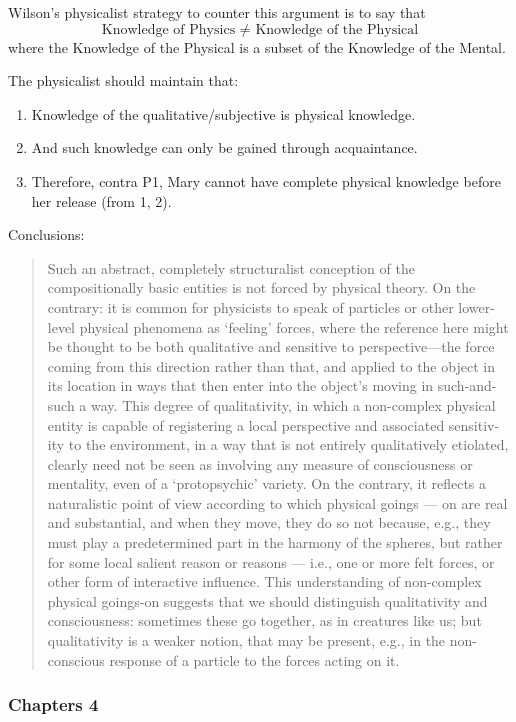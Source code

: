 \documentclass{article}
\newcommand{\tx}[1]{\text{#1}}
\begin{document}
Wilson's physicalist strategy to counter this argument is to say that
\[ \tx{Knowledge of Physics } \neq \tx{ Knowledge of the Physical} \]
where the Knowledge of the Physical is a subset of the Knowledge of the Mental.

The physicalist should maintain that:
\begin{enumerate}
\item Knowledge of the qualitative/subjective is physical knowledge.
\item And such knowledge can only be gained through acquaintance.
\item Therefore, contra P1, Mary cannot have complete physical knowledge before her release (from 1, 2).
\end{enumerate}

Conclusions:
\begin{quote}
Such an abstract, completely structuralist conception of the compositionally basic entities is not forced by physical theory. On the contrary: it is common for physicists to speak of particles or other lower-level physical phenomena as `feeling' forces, where the reference here might be thought to be both qualitative and sensitive to perspective—the force coming from this direction rather than that, and applied to the object in its location in ways that then enter into the object's moving in such-and-such a way. This degree of qualitativity, in which a non-complex physical entity is capable of registering a local perspective and associated sensitiv- ity to the environment, in a way that is not entirely qualitatively etiolated, clearly need not be seen as involving any measure of consciousness or mentality, even of a `protopsychic' variety. On the contrary, it reflects a naturalistic point of view according to which physical goings --- on are real and substantial, and when they move, they do so not because, e.g., they must play a predetermined part in the harmony of the spheres, but rather for some local salient reason or reasons --- i.e., one or more felt forces, or other form of interactive influence. This understanding of non-complex physical goings-on suggests that we should distinguish qualitativity and consciousness: sometimes these go together, as in creatures like us; but qualitativity is a weaker notion, that may be present, e.g., in the non-conscious response of a particle to the forces acting on it.
\end{quote}

\subsubsection*{Chapters 4}
\end{document}
